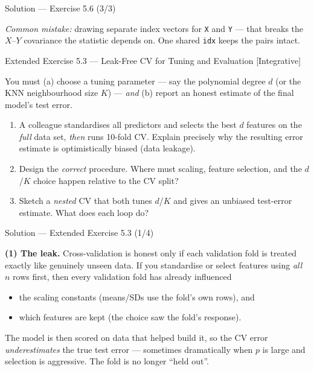 \documentclass[aspectratio=169,11pt]{beamer}
\begin{document}
\begin{frame}[fragile]{Solution --- Exercise 5.6 (3/3)}
  \begin{solutionbox}
    \emph{Common mistake:} drawing separate index vectors for \texttt{X}
    and \texttt{Y} --- that breaks the $X$--$Y$ covariance the statistic
    depends on. One shared \texttt{idx} keeps the pairs intact.
  \end{solutionbox}
\end{frame}


\begin{frame}{Extended Exercise 5.3 --- Leak-Free CV for Tuning and Evaluation [Integrative]}\label{frm:ee53}
  \begin{longexercise}
    You must (a) choose a tuning parameter --- say the polynomial degree
    $d$ (or the KNN neighbourhood size $K$) --- \emph{and} (b) report an
    honest estimate of the final model's test error.
    \begin{enumerate}
      \item A colleague standardises all predictors and selects the best
            $d$ features on the \emph{full} data set, \emph{then} runs
            10-fold CV. Explain precisely why the resulting error
            estimate is optimistically biased (data leakage).
      \item Design the \emph{correct} procedure. Where must scaling,
            feature selection, and the $d$/$K$ choice happen relative to
            the CV split?
      \item Sketch a \emph{nested} CV that both tunes $d$/$K$ and gives an
            unbiased test-error estimate. What does each loop do?
    \end{enumerate}
  \end{longexercise}
\end{frame}

\begin{frame}{Solution --- Extended Exercise 5.3 (1/4)}
  \begin{solutionbox}
    \textbf{(1) The leak.} Cross-validation is honest only if each
    validation fold is treated exactly like genuinely unseen data. If you
    standardise or select features using \emph{all} $n$ rows first, then
    every validation fold has already influenced
    \begin{itemize}
      \item the scaling constants (means/SDs use the fold's own rows), and
      \item which features are kept (the choice saw the fold's response).
    \end{itemize}
    The model is then scored on data that helped build it, so the CV
    error \emph{underestimates} the true test error --- sometimes
    dramatically when $p$ is large and selection is aggressive. The fold
    is no longer ``held out''.
  \end{solutionbox}
\end{frame}
\end{document}
